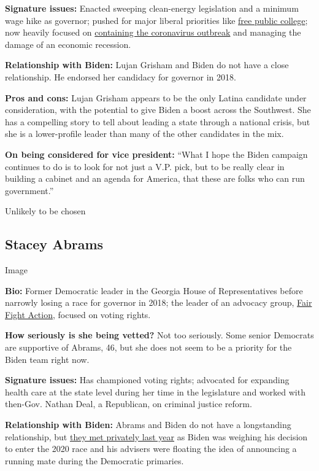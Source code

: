 \textbf{Signature issues:} Enacted sweeping clean-energy legislation and
a minimum wage hike as governor; pushed for major liberal priorities
like
\href{https://www.nytimes3xbfgragh.onion/2019/09/18/us/new-mexico-free-college-tuition.html}{free
public college}; now heavily focused on
\href{https://www.nytimes3xbfgragh.onion/2020/04/24/us/coronavirus-new-mexico.html}{containing
the coronavirus outbreak} and managing the damage of an economic
recession.

\textbf{Relationship with Biden:} Lujan Grisham and Biden do not have a
close relationship. He endorsed her candidacy for governor in 2018.

\textbf{Pros and cons:} Lujan Grisham appears to be the only Latina
candidate under consideration, with the potential to give Biden a boost
across the Southwest. She has a compelling story to tell about leading a
state through a national crisis, but she is a lower-profile leader than
many of the other candidates in the mix.

\textbf{On being considered for vice president:} ``What I hope the Biden
campaign continues to do is to look for not just a V.P. pick, but to be
really clear in building a cabinet and an agenda for America, that these
are folks who can run government.''

Unlikely to be chosen

\hypertarget{stacey-abrams}{%
\subsection{Stacey Abrams}\label{stacey-abrams}}

Image

\textbf{Bio:} Former Democratic leader in the Georgia House of
Representatives before narrowly losing a race for governor in 2018; the
leader of an advocacy group,
\href{https://www.nytimes3xbfgragh.onion/2019/08/13/us/politics/stacey-abrams-fair-fight-2020.html}{Fair
Fight Action}, focused on voting rights.

\textbf{How seriously is she being vetted?} Not too seriously. Some
senior Democrats are supportive of Abrams, 46, but she does not seem to
be a priority for the Biden team right now.

\textbf{Signature issues:} Has championed voting rights; advocated for
expanding health care at the state level during her time in the
legislature and worked with then-Gov. Nathan Deal, a Republican, on
criminal justice reform.

\textbf{Relationship with Biden:} Abrams and Biden do not have a
longstanding relationship, but
\href{https://www.nytimes3xbfgragh.onion/2019/03/21/us/politics/joe-biden-2020-election.html}{they
met privately last year} as Biden was weighing his decision to enter the
2020 race and his advisers were floating the idea of announcing a
running mate during the Democratic primaries.

